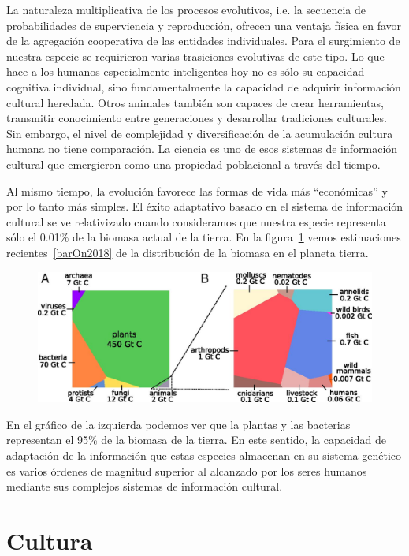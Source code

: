 \documentclass[a4paper,10pt]{book}
\newif\ifes
\newcommand{\es}[1]{\ifes#1\fi}
\begin{document}
La naturaleza multiplicativa de los procesos evolutivos, i.e. la secuencia de probabilidades de superviencia y reproducción, ofrecen una ventaja física en favor de la agregación cooperativa de las entidades individuales.
Para el surgimiento de nuestra especie se requirieron varias trasiciones evolutivas de este tipo.
Lo que hace a los humanos especialmente inteligentes hoy no es sólo su capacidad cognitiva individual, sino fundamentalmente la capacidad de adquirir información cultural heredada.
Otros animales también son capaces de crear herramientas, transmitir conocimiento entre generaciones y desarrollar tradiciones culturales.
Sin embargo, el nivel de complejidad y diversificación de la acumulación cultura humana no tiene comparación.
La ciencia es uno de esos sistemas de información cultural que emergieron como una propiedad poblacional a través del tiempo.


Al mismo tiempo, la evolución favorece las formas de vida más ``económicas'' y por lo tanto más simples.
El éxito adaptativo basado en el sistema de información cultural se ve relativizado cuando consideramos que nuestra especie representa sólo el 0.01\% de la biomasa actual de la tierra.
En la figura~\ref{fig:biomass} vemos estimaciones recientes~\ref{barOn2018} de la distribución de la biomasa en el planeta tierra.
\begin{figure}[ht!]
    \centering
    \includegraphics[width=0.7\linewidth]{static/biomass}
    \caption{
    \es{Distribución de la biomasa en el planeta tierra. }%
    }
    \label{fig:biomass}
\end{figure}
En el gráfico de la izquierda podemos ver que la plantas y las bacterias representan el 95\% de la biomasa de la tierra.
En este sentido, la capacidad de adaptación de la información que estas especies almacenan en su sistema genético es varios órdenes de magnitud superior al alcanzado por los seres humanos mediante sus complejos sistemas de información cultural.

\section{Cultura}
\end{document}

